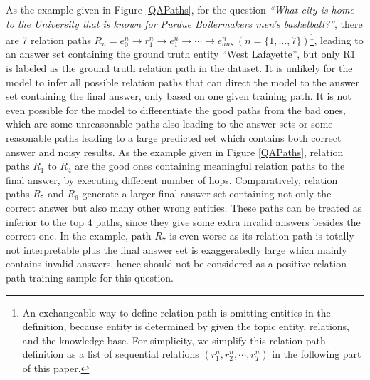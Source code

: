 As the example given in Figure \ref{QAPaths}, for the question \textit{``What city is home to the University that is known for Purdue Boilermakers men's basketball?''}, there are 7 relation paths $R_n={e^n_0\rightarrow r^n_1 \rightarrow e^n_1 \rightarrow \cdots \rightarrow e^n_{ans}}\ (n=\lbrace 1, \dots, 7 \rbrace)$\footnote{An exchangeable way to define relation path is omitting entities in the definition, because entity is determined by given the topic entity, relations, and the knowledge base. For simplicity, we simplify this relation path definition as a list of sequential relations $(r_{1}^n, r_{2}^n, \cdots, r_{T}^n)$ in the following part of this paper.}, leading to an answer set containing the ground truth entity ``West Lafayette'', but only R1 is labeled as the ground truth relation path in the dataset. It is unlikely for the model to infer all possible relation paths that can direct the model to the answer set containing the final answer, only based on one given training path. It is not even possible for the model to differentiate the good paths from the bad ones, which are some unreasonable paths also leading to the answer sets %
or some reasonable paths leading to a large predicted set which contains both correct answer and noisy results. As the example given in Figure \ref{QAPaths}, relation paths $R_1$ to $R_4$ are the good ones containing meaningful relation paths to the final answer, by executing different number of hops. Comparatively, relation paths $R_5$ and $R_6$ generate a larger final answer set containing not only the correct answer but also many other wrong entities. These paths can be treated as inferior to the top 4 paths, since they give some extra invalid answers besides the correct one. In the example, path $R_7$ is even worse as its relation path is totally not interpretable plus the final answer set is exaggeratedly large which mainly contains invalid answers, hence should not be considered as a positive relation path training sample for this question. 

